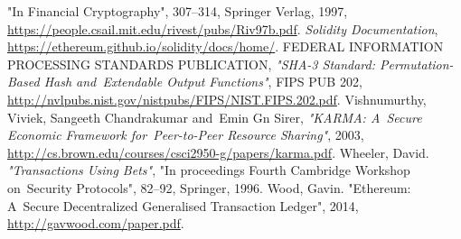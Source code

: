 \documentclass[a4paper]{article}
\begin{document}
\begin{thebibliography}{9}
    "In Financial Cryptography", 307--314, Springer Verlag, 1997,
    \url{https://people.csail.mit.edu/rivest/pubs/Riv97b.pdf}.
 \textit{Solidity Documentation}, \url{https://ethereum.github.io/solidity/docs/home/}.
 FEDERAL INFORMATION PROCESSING STANDARDS PUBLICATION,
    \textit{"SHA-3 Standard: Permutation-Based Hash and~Extendable Output Functions"}, FIPS PUB 202,
    \url{http://nvlpubs.nist.gov/nistpubs/FIPS/NIST.FIPS.202.pdf}.
 Vishnumurthy, Viviek, Sangeeth Chandrakumar and~Emin Gn Sirer, \textit{"KARMA: A~Secure
    Economic Framework for~Peer-to-Peer Resource Sharing"}, 2003,
   \url{http://cs.brown.edu/courses/csci2950-g/papers/karma.pdf}.
 Wheeler, David. \textit{"Transactions Using Bets"},
    "In proceedings Fourth Cambridge Workshop on~Security Protocols", 82--92, Springer, 1996.
 Wood, Gavin. "Ethereum: A~Secure Decentralized Generalised Transaction Ledger", 2014,
    \url{http://gavwood.com/paper.pdf}.
\end{thebibliography}
\appendix
\end{document}
